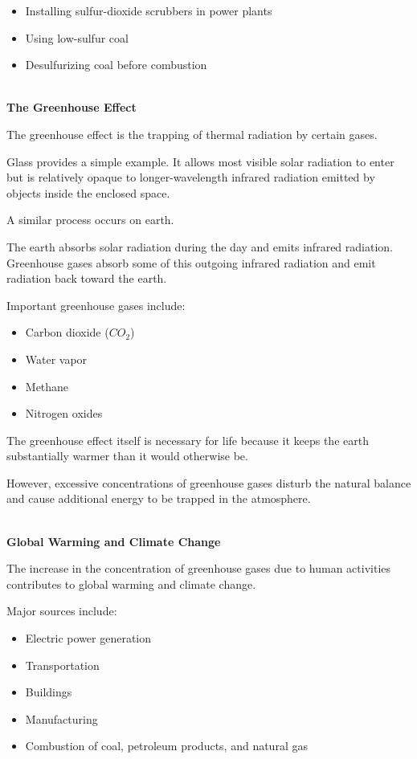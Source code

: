 \documentclass[12pt]{article}
\begin{document}
\begin{itemize}
    \item Installing sulfur-dioxide scrubbers in power plants
    \item Using low-sulfur coal
    \item Desulfurizing coal before combustion
\end{itemize}

\textbf{\\ The Greenhouse Effect}

The greenhouse effect is the trapping of thermal radiation by certain gases.

Glass provides a simple example. It allows most visible solar radiation to enter but is relatively opaque to longer-wavelength infrared radiation emitted by objects inside the enclosed space.

A similar process occurs on earth.

The earth absorbs solar radiation during the day and emits infrared radiation. Greenhouse gases absorb some of this outgoing infrared radiation and emit radiation back toward the earth.

Important greenhouse gases include:

\begin{itemize}
    \item Carbon dioxide ($CO_2$)
    \item Water vapor
    \item Methane
    \item Nitrogen oxides
\end{itemize}

The greenhouse effect itself is necessary for life because it keeps the earth substantially warmer than it would otherwise be.

However, excessive concentrations of greenhouse gases disturb the natural balance and cause additional energy to be trapped in the atmosphere.

\textbf{\\ Global Warming and Climate Change}

The increase in the concentration of greenhouse gases due to human activities contributes to global warming and climate change.

Major sources include:

\begin{itemize}
    \item Electric power generation
    \item Transportation
    \item Buildings
    \item Manufacturing
    \item Combustion of coal, petroleum products, and natural gas
\end{itemize}
\end{document}
